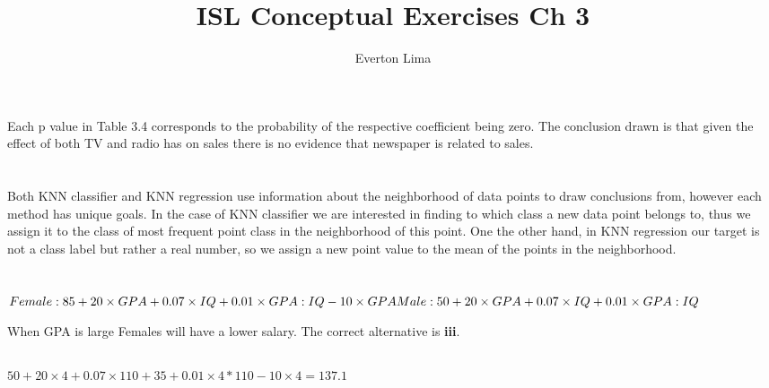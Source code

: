 \documentclass[11pt, oneside]{article}   	%
\title{ISL Conceptual Exercises Ch 3}
\author{Everton Lima}
\begin{document}
\maketitle

\section{}

Each p value in Table 3.4 corresponds to the probability of the respective coefficient being zero. The conclusion drawn is that given the effect of both TV and radio has on sales there is no evidence that newspaper is related to sales.

\section{}

Both KNN classifier and KNN regression use information about the neighborhood of data points to draw conclusions from, however each method has unique goals. In the case of KNN classifier we are interested in finding to which class a new data point belongs to, thus we assign it to the class of most frequent point class in the neighborhood of this point. One the other hand, in KNN regression our target is not a class label but rather a real number, so we assign a new point value to the mean of the points in the neighborhood.

\section{}
\subsection{}
   \begin{math} 
   \\ Female: 85+20\times GPA+0.07\times IQ+0.01\times GPA:IQ-10\times GPA 
   \\ Male: 50+20\times GPA+0.07\times IQ+0.01\times GPA:IQ
   \\
   \end{math}

When GPA is large Females will have a lower salary. The correct alternative is \textbf{iii}.
   
  \subsection{}
$50+20\times4+0.07\times110+35+0.01\times4*110-10\times 4 = 137.1$
\end{document}

